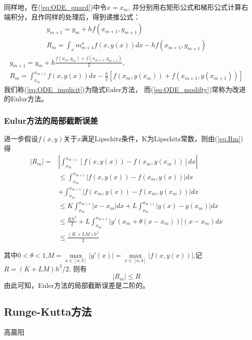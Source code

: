 同样地，在(\ref{eq:ODE_quard})中令$x = x_m$, 并分别用右矩形公式和梯形公式计算右端积分，且作同样的处理后，得到递推公式：
\begin{equation}\label{eq:ODE_implicit}
		\begin{aligned}
				y_{m+1}=y_m + h f(x_{m+1} , y_{m+1})\\
		        R_m = \int_xm^x_{m+1} f(x,y(x)) dx - h f(x_{m+1}, y_{m+1})
        \end{aligned}
\end{equation}
\begin{equation}\label{eq:ODE_modifty}
		\begin{aligned}
				y_{m+1}= y_m + h \frac{f(x_m,y_m) + f(x_{m+1},y_{m+1})}{2},\\
				R_m = \int_{x_m}^{x_{m+1}} f(x,y(x))dx- \frac{h}{2}[f(x_m,y(x_m))+ f(x_{m+1},y(x_{m+1}))]
		\end{aligned}
\end{equation}
我们称(\ref{eq:ODE_implicit})为隐式Euler方法， 而(\ref{eq:ODE_modifty})常称为改进的Eulur方法。
\subsubsection{Eulur方法的局部截断误差}
进一步假设$f(x,y)$关于$x$满足Lipschitz条件，K为Lipschitz常数，则由(\ref{eq:Rm})得
\begin{equation*}
		\begin{aligned}
				|R_m|= & | \int_{x_m}^{x_{m+1}} [f(x,y(x)) - f(x_m,y(x_m))] dx|\\
				&\leq \int_{x_m}^{x_{m+1}}|f(x,y(x)) - f(x_m, y(x))| dx\\
				&+\int_{x_m}^{x_{m+1}}|f(x_m,y(x)) - f(x_m, y(x_m))| dx\\
				&\leq K \int_{x_m}^{x_{m+1}}|x-x_m|dx + L\int_{x_m}^{x_{m+1}}|y(x)-y(x_m)|dx\\
				&\leq \frac{Kh^2}{2}+ L\int_{x_m}^{x_{m+1}}|y'(x_m+\theta (x-x_m))|(x-x_m)dx\\
				&\leq \frac{(K+LM)h^2}{2}
		\end{aligned}
\end{equation*}

其中$0 <\theta < 1$,$ M = \max\limits_{x \in [a,b]}|y'(x)| = \max\limits_{x\in[a,b]}|f(x,y(x))|$,记$R= (K+LM)h^2/2$, 则有
$$ |R_m| \leq R $$
由此可知，Euler方法的局部截断误差是二阶的。

\subsection{Runge-Kutta方法}
{\color{red}\begin{center}
     高晨阳
\end{center}}

